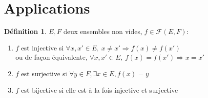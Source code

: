 \documentclass[fleqn]{article}
\theoremstyle{definition} \newtheorem*{defi}{D\'efinition}
\theoremstyle{definition} \newtheorem*{theo}{Th\'eor\`eme}
\theoremstyle{definition} \newtheorem*{coro}{Corollaire}
\theoremstyle{remark} \newtheorem*{rqs}{Remarques}
\theoremstyle{definition} \newtheorem*{prop}{Propri\'et\'e}
\begin{document}
\section{Applications}
\begin{defi}
	\(E, F\) deux ensembles non vides, \( f \in \mathcal{F}(E, F)\):
	\begin{enumerate}
		\item \(f\) est injective si \(\forall x,x' \in E,\ x \neq x' \Rightarrow f(x) \neq f(x')\) \\
		ou de fa\c{c}on \'equivalente, \(\forall x,x' \in E,\ f(x) = f(x') \Rightarrow x = x'\)
		\item \(f\) est surjective si \(\forall y \in F, \exists x \in E, f(x) = y\)
		\item \(f\) est bijective si elle est \`a la fois injective et surjective
	\end{enumerate}
\end{defi}
\end{document}
